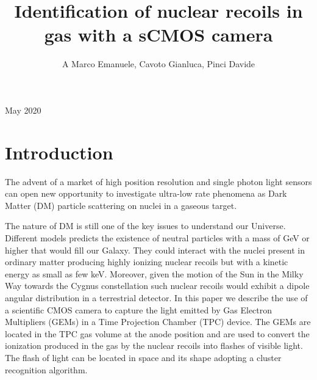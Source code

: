 \documentclass[12pt]{iopart}
\begin{document}
\title[]{Identification of  nuclear recoils in gas  with a sCMOS camera}

\author{A Marco Emanuele, Cavoto Gianluca, Pinci Davide}

\address{San Miguel, Mexico}
\vspace{10pt}
\begin{indented}
\item[]May 2020
\end{indented}

\begin{abstract}

\end{abstract}

%
%
%
% 
%



\section{Introduction}

The advent of a market of high position resolution and single photon  light sensors can open new opportunity to investigate ultra-low rate phenomena as Dark Matter  (DM) particle  scattering on nuclei in a gaseous  target.

The nature of DM is still one of the key  issues to understand  our Universe. Different models  predicts the existence of neutral particles with a mass of GeV  or higher that would fill our Galaxy. They  could interact with the nuclei present in ordinary matter producing highly ionizing nuclear recoils but with a  kinetic energy as small as  few keV. Moreover, given the motion of the Sun in the Milky Way towards the Cygnus constellation such nuclear recoils would exhibit a dipole angular distribution in a terrestrial detector.
In this paper we describe the use of a scientific CMOS camera to capture the light emitted by Gas Electron Multipliers (GEMs) in a Time Projection Chamber (TPC) device. The GEMs are located in the TPC gas volume at the anode position and are used to convert the ionization produced in the gas by   the  nuclear recoils into flashes of visible light. The flash of light can be located in space and its shape adopting a cluster  recognition algorithm.
 
\end{document}
